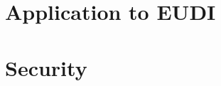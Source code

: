 \documentclass{iacrtrans}
\newcommand{\jbel}[1]{{\color{blue}{}jbel: #1}}
\begin{document}


\section{Application to EUDI}
\label{sec:appeudi}




\section{Security}
\label{sec:security}


        
\end{document}
